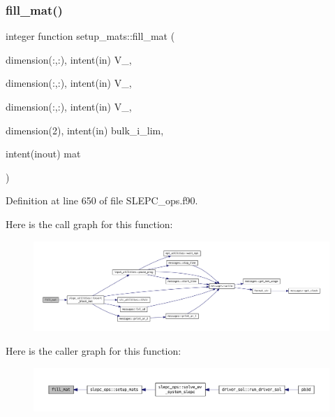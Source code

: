 \subsubsection{\texorpdfstring{fill\+\_\+mat()}{fill\_mat()}}
{\footnotesize\ttfamily integer function setup\+\_\+mats\+::fill\+\_\+mat (\begin{DoxyParamCaption}\item[{dimension(\+:,\+:), intent(in)}]{V\+\_,  }\item[{dimension(\+:,\+:), intent(in)}]{V\+\_,  }\item[{dimension(\+:,\+:), intent(in)}]{V\+\_,  }\item[{dimension(2), intent(in)}]{bulk\+\_\+i\+\_\+lim,  }\item[{intent(inout)}]{mat }\end{DoxyParamCaption})}



Definition at line 650 of file S\+L\+E\+P\+C\+\_\+ops.\+f90.

Here is the call graph for this function\+:
\nopagebreak
\begin{figure}[H]
\begin{center}
\leavevmode
\includegraphics[width=350pt]{SLEPC__ops_8f90_a2304e2ffd00378a9252c04507d5a1a7e_cgraph}
\end{center}
\end{figure}
Here is the caller graph for this function\+:
\nopagebreak
\begin{figure}[H]
\begin{center}
\leavevmode
\includegraphics[width=350pt]{SLEPC__ops_8f90_a2304e2ffd00378a9252c04507d5a1a7e_icgraph}
\end{center}
\end{figure}
\mbox{\label{SLEPC__ops_8f90_a3200b53f49d7eeb22c2625ac965f9f7c}} 
